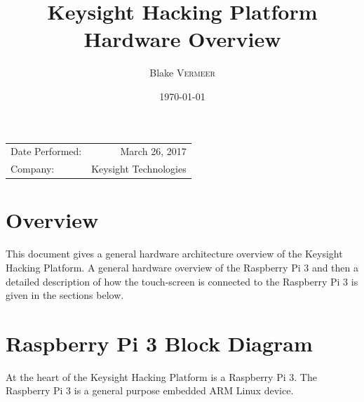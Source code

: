 \documentclass{article}
\title{Keysight Hacking Platform Hardware Overview} %
\author{Blake \textsc{Vermeer}} %
\date{\today} %
\begin{document}
\maketitle %

\begin{center}
\begin{tabular}{l r}
Date Performed: & March 26, 2017 \\ %
Company: & Keysight Technologies %
\end{tabular}
\end{center}


\section{Overview}

This document gives a general hardware architecture overview of the Keysight Hacking Platform. A general hardware overview of the Raspberry Pi 3 and then a detailed description of how the touch-screen is connected to the Raspberry Pi 3 is given in the sections below.


\section{Raspberry Pi 3 Block Diagram}

At the heart of the Keysight Hacking Platform is a Raspberry Pi 3. The Raspberry Pi 3 is a general purpose embedded ARM Linux device. 
\end{document}
